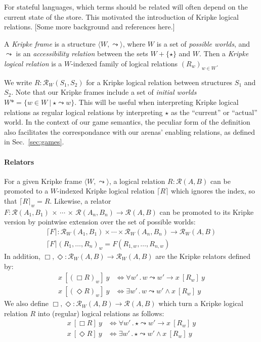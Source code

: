 \documentclass[sigplan,10pt,review,anonymous]{acmart}
\newcommand{\ifr}[1]{\ [{#1}]\ }
\begin{document}
For stateful languages,
which terms should be related
will often depend on the current state of the store.
This motivated the introduction of Kripke logical relations.
[Some more background and references here.]

\begin{definition}
A \emph{Kripke frame} is a structure $\langle W, \leadsto \rangle$, where
$W$ is a set of \emph{possible worlds}, and
$\leadsto$ is an \emph{accessibility relation}
between the sets $W + \{\star\}$ and $W$.
Then a \emph{Kripke logical relation} is
a $W$-indexed family of logical relations $(R_w)_{w \in W}$.
\end{definition}

We write $R : \mathcal{R}_W(S_1, S_2)$
for a Kripke logical relation between structures $S_1$ and $S_2$.
Note that our Kripke frames
include a set of \emph{initial worlds}
$W* = \{ w \in W \ |\  \star \leadsto w \}$.
This will be useful when interpreting Kripke logical relations
as regular logical relations
by interpreting $\star$ as the ``current'' or ``actual'' world.
In the context of our game semantics,
the peculiar form of the definition
also facilitates the correspondance with
our arenas' enabling relations,
as defined in Sec.~\ref{sec:games}.

\paragraph{Relators}

For a given Kripke frame $\langle W, \leadsto \rangle$,
a logical relation $R : \mathcal{R}(A, B)$
can be promoted to a $W$-indexed Kripke logical relation $\lceil R \rceil$
which ignores the index, so that $\lceil R \rceil_w = R$.
Likewise,
a relator
  $F : \mathcal{R}(A_1, B_1) \,\times\,\cdots\,\times\,\mathcal{R}(A_n, B_n) \rightarrow \mathcal{R}(A, B)$
can be promoted to its Kripke version
by pointwise extension over the set of possible worlds:
\begin{gather*}
  \lceil F \rceil : \mathcal{R}_W(A_1, B_1) \times \cdots \times \mathcal{R}_W(A_n, B_n) \rightarrow \mathcal{R}_W(A, B) \\
  \lceil F \rceil (R_1, \ldots, R_n)_w = F(R_{1,w}, \ldots, R_{n,w})
\end{gather*}
In addition,
$\Box, \Diamond : \mathcal{R}_W(A,B) \rightarrow \mathcal{R}_W(A,B)$
are the Kripke relators defined by:
\begin{align*}
  x \ifr{(\Box R)_w} y &\Leftrightarrow
    \forall w' \,.\, w \leadsto w' \rightarrow x \ifr{R_w} y \\
  x \ifr{(\Diamond R)_w} y &\Leftrightarrow
    \exists w' \,.\, w \leadsto w' \wedge x \ifr{R_w} y
\end{align*}
We also define
$\Box, \Diamond : \mathcal{R}_W(A,B) \rightarrow \mathcal{R}(A,B)$
which turn a Kripke logical relation $R$
into (regular) logical relations as follows:
\begin{align*}
  x \ifr{\Box R} y &\Leftrightarrow
    \forall w' \,.\, \star \leadsto w' \rightarrow x \ifr{R_w} y \\
  x \ifr{\Diamond R} y &\Leftrightarrow
    \exists w' \,.\, \star \leadsto w' \wedge x \ifr{R_w} y
\end{align*}
\end{document}
